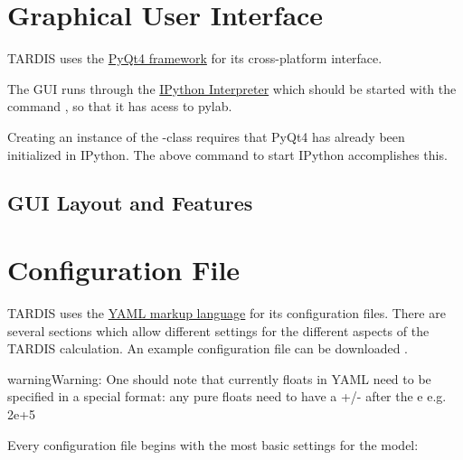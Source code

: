 \documentclass[letterpaper,10pt,english]{sphinxmanual}
\begin{document}
\chapter{Graphical User Interface}
\label{gui::doc}\label{gui:graphical-user-interface}
TARDIS uses the \href{http://www.riverbankcomputing.com/software/pyqt/download}{PyQt4 framework} for its cross-platform
interface.

The GUI runs through the \href{http://ipython.org/install.html}{IPython Interpreter} which should be started with the
command , so that it has acess to pylab.

Creating an instance of the -class requires that PyQt4 has already been initialized in
IPython. The above command to start IPython accomplishes this.


\section{GUI Layout and Features}
\label{gui:gui-layout-and-features}

\chapter{Configuration File}
\label{configuration:configuration-file}\label{configuration::doc}\label{configuration:config-file}
TARDIS uses the \href{https://en.wikipedia.org/wiki/YAML}{YAML markup language} for its configuration files. There are several sections which allow different
settings for the different aspects of the TARDIS calculation. An example configuration file can be downloaded
.

\begin{notice}{warning}{Warning:}
One should note that currently floats in YAML need to be specified in a special format:
any pure floats need to have a +/- after the e e.g. 2e+5
\end{notice}

Every configuration file begins with the most basic settings for the model:
\end{document}
